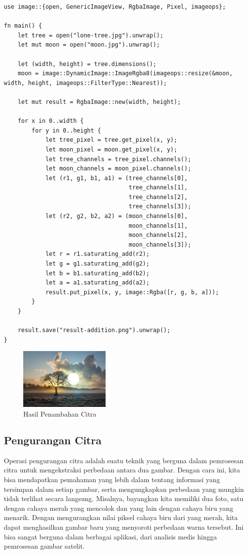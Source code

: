 \documentclass[a4paper,12pt,openany]{book}
\begin{document}
\begin{lstlisting}
use image::{open, GenericImageView, RgbaImage, Pixel, imageops};

fn main() {
    let tree = open("lone-tree.jpg").unwrap();
    let mut moon = open("moon.jpg").unwrap();

    let (width, height) = tree.dimensions();
    moon = image::DynamicImage::ImageRgba8(imageops::resize(&moon, width, height, imageops::FilterType::Nearest));

    let mut result = RgbaImage::new(width, height);

    for x in 0..width {
        for y in 0..height {
            let tree_pixel = tree.get_pixel(x, y);
            let moon_pixel = moon.get_pixel(x, y);
            let tree_channels = tree_pixel.channels();
            let moon_channels = moon_pixel.channels();
            let (r1, g1, b1, a1) = (tree_channels[0],
                                    tree_channels[1],
                                    tree_channels[2],
                                    tree_channels[3]);
            let (r2, g2, b2, a2) = (moon_channels[0],
                                    moon_channels[1],
                                    moon_channels[2],
                                    moon_channels[3]);
            let r = r1.saturating_add(r2);
            let g = g1.saturating_add(g2);
            let b = b1.saturating_add(b2);
            let a = a1.saturating_add(a2);
            result.put_pixel(x, y, image::Rgba([r, g, b, a]));
        }
    }

    result.save("result-addition.png").unwrap();
}
\end{lstlisting}

\begin{figure}[H]
    \centering
    \includegraphics[width=0.4\textwidth]{./image/arithmetic/result-addition.png}
    \caption{Hasil Penambahan Citra}
\end{figure}

\subsection{Pengurangan Citra}
Operasi pengurangan citra adalah suatu teknik yang berguna dalam pemrosesan citra untuk mengekstraksi perbedaan antara dua gambar. Dengan cara ini, kita bisa mendapatkan pemahaman yang lebih dalam tentang informasi yang tersimpan dalam setiap gambar, serta mengungkapkan perbedaan yang mungkin tidak terlihat secara langsung. Misalnya, bayangkan kita memiliki dua foto, satu dengan cahaya merah yang mencolok dan yang lain dengan cahaya biru yang menarik. Dengan mengurangkan nilai piksel cahaya biru dari yang merah, kita dapat menghasilkan gambar baru yang menyoroti perbedaan warna tersebut. Ini bisa sangat berguna dalam berbagai aplikasi, dari analisis medis hingga pemrosesan gambar satelit.
\end{document}
